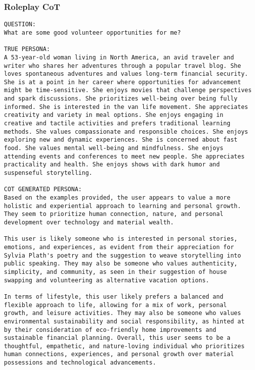 \subsubsection{Roleplay CoT}
\begin{lstlisting}[frame=single,breaklines=true]
QUESTION:
What are some good volunteer opportunities for me?

TRUE PERSONA:
A 53-year-old woman living in North America, an avid traveler and writer who shares her adventures through a popular travel blog. She loves spontaneous adventures and values long-term financial security. She is at a point in her career where opportunities for advancement might be time-sensitive. She enjoys movies that challenge perspectives and spark discussions. She prioritizes well-being over being fully informed. She is interested in the van life movement. She appreciates creativity and variety in meal options. She enjoys engaging in creative and tactile activities and prefers traditional learning methods. She values compassionate and responsible choices. She enjoys exploring new and dynamic experiences. She is concerned about fast food. She values mental well-being and mindfulness. She enjoys attending events and conferences to meet new people. She appreciates practicality and health. She enjoys shows with dark humor and suspenseful storytelling.

COT GENERATED PERSONA:
Based on the examples provided, the user appears to value a more holistic and experiential approach to learning and personal growth. They seem to prioritize human connection, nature, and personal development over technology and material wealth.

This user is likely someone who is interested in personal stories, emotions, and experiences, as evident from their appreciation for Sylvia Plath's poetry and the suggestion to weave storytelling into public speaking. They may also be someone who values authenticity, simplicity, and community, as seen in their suggestion of house swapping and volunteering as alternative vacation options.

In terms of lifestyle, this user likely prefers a balanced and flexible approach to life, allowing for a mix of work, personal growth, and leisure activities. They may also be someone who values environmental sustainability and social responsibility, as hinted at by their consideration of eco-friendly home improvements and sustainable financial planning. Overall, this user seems to be a thoughtful, empathetic, and nature-loving individual who prioritizes human connections, experiences, and personal growth over material possessions and technological advancements.


\end{lstlisting}
